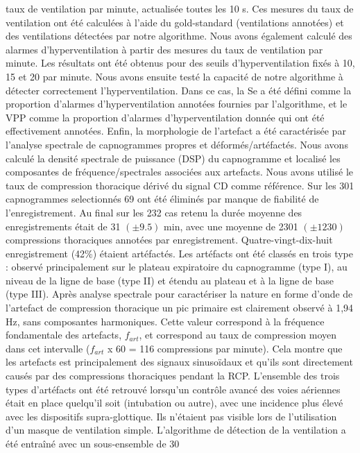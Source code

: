 \documentclass[12pt,]{article}
\begin{document}
taux de ventilation par minute, actualisée toutes les 10 s. Ces mesures
du taux de ventilation ont été calculées à l'aide du gold-standard
(ventilations annotées) et des ventilations détectées par notre
algorithme. Nous avons également calculé des alarmes d'hyperventilation
à partir des mesures du taux de ventilation par minute. Les résultats
ont été obtenus pour des seuils d'hyperventilation fixés à 10, 15 et 20
par minute. Nous avons ensuite testé la capacité de notre algorithme à
détecter correctement l'hyperventilation. Dans ce cas, la Se a été
défini comme la proportion d'alarmes d'hyperventilation annotées
fournies par l'algorithme, et le VPP comme la proportion d'alarmes
d'hyperventilation donnée qui ont été effectivement annotées. Enfin, la
morphologie de l'artefact a été caractérisée par l'analyse spectrale de
capnogrammes propres et déformés/artéfactés. Nous avons calculé la
densité spectrale de puissance (DSP) du capnogramme et localisé les
composantes de fréquence/spectrales associées aux artefacts. Nous avons
utilisé le taux de compression thoracique dérivé du signal CD comme
référence. Sur les 301 capnogrammes selectionnés 69 ont été éliminés par
manque de fiabilité de l'enregistrement. Au final sur les 232 cas retenu
la durée moyenne des enregistrements était de 31 \((\pm9.5)\) min, avec
une moyenne de 2301 \((\pm1230)\) compressions thoraciques annotées par
enregistrement. Quatre-vingt-dix-huit enregistrement (42\%) étaient
artéfactés. Les artéfacts ont été classés en trois type : observé
principalement sur le plateau expiratoire du capnogramme (type I), au
niveau de la ligne de base (type II) et étendu au plateau et à la ligne
de base (type III). Après analyse spectrale pour caractériser la nature
en forme d'onde de l'artefact de compression thoracique un pic primaire
est clairement observé à 1,94 Hz, sans composantes harmoniques. Cette
valeur correspond à la fréquence fondamentale des artefacts,
\(f_{art}\), et correspond au taux de compression moyen dans cet
intervalle (\(f_{art}\) x 60 = 116 compressions par minute). Cela montre
que les artefacts est principalement des signaux sinusoïdaux et qu'ils
sont directement causés par des compressions thoraciques pendant la RCP.
L'ensemble des trois types d'artéfacts ont été retrouvé lorsqu'un
contrôle avancé des voies aériennes était en place quelqu'il soit
(intubation ou autre), avec une incidence plus élevé avec les
dispositifs supra-glottique. Ils n'étaient pas visible lors de
l'utilisation d'un masque de ventilation simple. L'algorithme de
détection de la ventilation a été entraîné avec un sous-ensemble de 30
\end{document}
